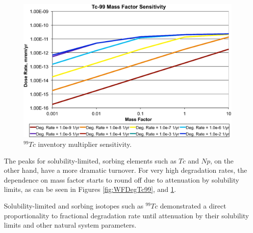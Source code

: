 \begin{figure}[H]
  \centering
  \includegraphics[width=\linewidth]{Tc99_mass_factor.eps}
  \caption{$^{99}Tc$ inventory multiplier sensitivity.}
  \label{fig:WFDegTc99MF}
\end{figure}

The peaks for solubility-limited, sorbing elements such as $Tc$ and $Np$, on the 
other hand, have a more dramatic turnover.  For very high degradation rates, the 
dependence on mass factor starts to round off due to attenuation by solubility 
limits, as can be seen in Figures 
\ref{fig:WFDegTc99}, and \ref{fig:WFDegTc99MF}.


Solubility-limited and sorbing isotopes such as $^{99}Tc$ demonstrated a direct 
proportionality to fractional degradation rate until attenuation by their 
solubility limits and other natural system parameters. 

